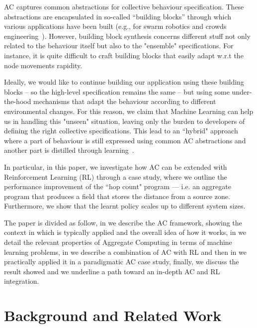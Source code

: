 \documentclass[conference]{IEEEtran}
\begin{document}
AC captures common abstractions for collective behaviour specification. 
 These abstractions are encapsulated in so-called ``building blocks'' through which various
 applications have been built 
 (e.g., for swarm robotics and crowds engineering~\cite{DBLP:journals/eaai/CasadeiVAPD21}).
However, building block synthesis concerns different stuff not only related to the behaviour itself
 but also to the "ensemble" specifications. 
 For instance, it is quite difficult to craft building blocks
 that easily adapt w.r.t the node movements rapidity.

Ideally, we would like to continue building our application using these building blocks -- so the high-level specification remains the same -- but using some
 under-the-hood mechanisms that adapt the behaviour according to different environmental changes. For this reason, we claim that Machine Learning can help us in handling this "unseen" situation, leaving only the burden
 to developers of defining the right collective specifications.
This lead to an ``hybrid" approach where a part of behaviour is still expressed using common 
 AC abstractions and another part is distilled through learning~\cite{research}.

In particular, in this paper,
 we investigate how AC can be extended with Reinforcement Learning (RL) through a case study,
 where we outline the performance improvement of the ``hop count" program --- 
 i.e. an aggregate program that produces a field that stores the distance from a source zone. 
 Furthermore, we show that the learnt policy scales up to different system sizes.

The paper is divided as follow, in  we describe
 the AC framework, showing the context in which
 is typically applied and the overall idea of how it works, in  we detail the relevant properties of Aggregate
 Computing in terms of machine learning problems, in  we describe a combination of AC with RL and then in
  we practically applied it in a paradigmatic AC case study,
 finally,  we discuss the result showed and we underline a path toward an in-depth AC and RL integration.

 \section{Background and Related Work}\label{background}

\end{document}
